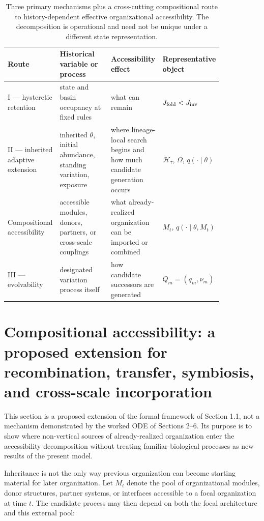\documentclass[11pt,a4paper]{article}
\begin{document}
\begin{table}[htbp]
\centering
\small
\begin{tabular}{>{\raggedright\arraybackslash}p{0.17\linewidth}>{\raggedright\arraybackslash}p{0.25\linewidth}>{\raggedright\arraybackslash}p{0.24\linewidth}>{\raggedright\arraybackslash}p{0.18\linewidth}}
\toprule
Route & Historical variable or process & Accessibility effect & Representative object \\
\midrule
I --- hysteretic retention & state and basin occupancy at fixed rules & what can remain & $J_{\rm fold}<J_{\rm inv}$ \\
II --- inherited adaptive extension & inherited $\theta$, initial abundance, standing variation, exposure & where lineage-local search begins and how much candidate generation occurs & $\mathcal H_\tau$, $\Omega$, $q(\cdot\mid\theta)$ \\
Compositional accessibility & accessible modules, donors, partners, or cross-scale couplings & what already-realized organization can be imported or combined & $M_t$, $q(\cdot\mid\theta,M_t)$ \\
III --- evolvability & designated variation process itself & how candidate successors are generated & $Q_m=(q_m,\nu_m)$ \\
\bottomrule
\end{tabular}
\caption{Three primary mechanisms plus a cross-cutting compositional route to history-dependent effective organizational accessibility. The decomposition is operational and need not be unique under a different state representation.}
\label{tab:mechanisms}
\end{table}

\section{Compositional accessibility: a proposed extension for recombination, transfer, symbiosis, and cross-scale incorporation}

This section is a proposed extension of the formal framework of Section 1.1, not a mechanism demonstrated by the worked ODE of Sections 2--6. Its purpose is to show where non-vertical sources of already-realized organization enter the accessibility decomposition without treating familiar biological processes as new results of the present model.

Inheritance is not the only way previous organization can become starting material for later organization. Let $M_t$ denote the pool of organizational modules, donor structures, partner systems, or interfaces accessible to a focal organization at time $t$. The candidate process may then depend on both the focal architecture and this external pool:
\end{document}
